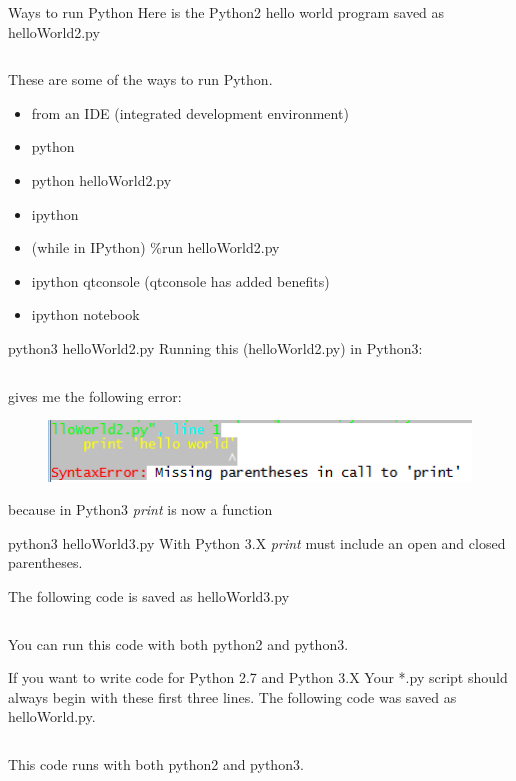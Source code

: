 \documentclass[10pt]{beamer}
\begin{document}
\begin{frame}{Ways to run Python}
Here is the Python2 hello world program saved as helloWorld2.py
\inputminted{python}{code/helloWorld2.py}


These are some of the ways to run Python.
\begin{itemize}
\item from an IDE (integrated development environment)
\item python
\item python helloWorld2.py
\item ipython
\item (while in IPython) \%run helloWorld2.py
\item ipython qtconsole (qtconsole has added benefits)
\item ipython notebook
\end{itemize}
\end{frame}

\begin{frame}{python3 helloWorld2.py}
Running this (helloWorld2.py) in Python3:
\inputminted{python}{code/helloWorld2.py}
gives me the following error:
\begin{figure} 	
 	\includegraphics[width=1.0\textwidth]{figs/print23.png}
\end{figure}
because in Python3 \textit{print} is now a function
\end{frame}

\begin{frame}{python3 helloWorld3.py}
With Python 3.X \textit{print} must include an open and closed parentheses. 

The following code is saved as helloWorld3.py
\inputminted{python}{code/helloWorld3.py}

You can run this code with both python2 and python3.
\end{frame}

\begin{frame}{If you want to write code for Python 2.7 and Python 3.X}
Your *.py script should always begin with these first three lines. The following code was saved as helloWorld.py.
\inputminted{python}{code/helloWorld.py}
This code runs with both python2 and python3. 
\end{frame}
\end{document}
